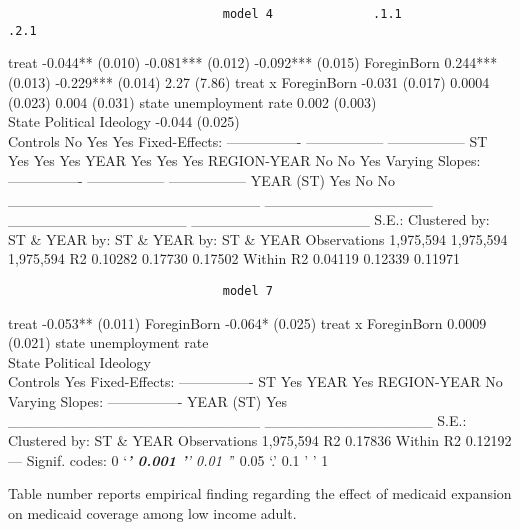 \documentclass[
]{article}
\begin{document}
\begin{verbatim}
                              model 4              .1.1              .2.1
\end{verbatim}

treat -0.044** (0.010) -0.081*** (0.012) -0.092*** (0.015) ForeginBorn
0.244*** (0.013) -0.229*** (0.014) 2.27 (7.86) treat x ForeginBorn
-0.031 (0.017) 0.0004 (0.023) 0.004 (0.031) state unemployment rate
0.002 (0.003)\\
State Political Ideology -0.044 (0.025)\\
Controls No Yes Yes Fixed-Effects: ---------------- -----------------
----------------- ST Yes Yes Yes YEAR Yes Yes Yes REGION-YEAR No No Yes
Varying Slopes: ---------------- ----------------- -----------------
YEAR (ST) Yes No No \_\_\_\_\_\_\_\_\_\_\_\_\_\_\_\_\_\_\_\_\_\_\_\_
\_\_\_\_\_\_\_\_\_\_\_\_\_\_\_\_ \_\_\_\_\_\_\_\_\_\_\_\_\_\_\_\_\_
\_\_\_\_\_\_\_\_\_\_\_\_\_\_\_\_\_ S.E.: Clustered by: ST \& YEAR by: ST
\& YEAR by: ST \& YEAR Observations 1,975,594 1,975,594 1,975,594 R2
0.10282 0.17730 0.17502 Within R2 0.04119 0.12339 0.11971

\begin{verbatim}
                              model 7
\end{verbatim}

treat -0.053** (0.011) ForeginBorn -0.064* (0.025) treat x ForeginBorn
0.0009 (0.021) state unemployment rate\\
State Political Ideology\\
Controls Yes Fixed-Effects: ---------------- ST Yes YEAR Yes REGION-YEAR
No Varying Slopes: ---------------- YEAR (ST) Yes
\_\_\_\_\_\_\_\_\_\_\_\_\_\_\_\_\_\_\_\_\_\_\_\_
\_\_\_\_\_\_\_\_\_\_\_\_\_\_\_\_ S.E.: Clustered by: ST \& YEAR
Observations 1,975,594 R2 0.17836 Within R2 0.12192 --- Signif. codes: 0
`\emph{\textbf{' 0.001 '}' 0.01 '}' 0.05 `.' 0.1 ' ' 1

Table number reports empirical finding regarding the effect of medicaid
expansion on medicaid coverage among low income adult.
\end{document}
